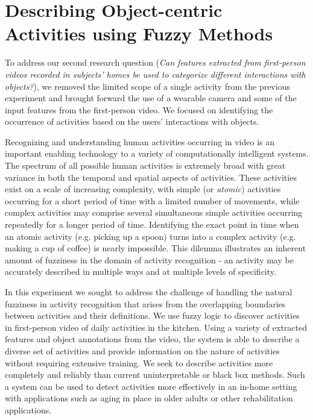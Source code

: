 \documentclass[12pt]{report}
\begin{document}
\section{Describing Object-centric Activities using Fuzzy Methods}
To address our second research question (\emph{Can features extracted from first-person videos recorded in subjects’ homes be used to categorize different interactions with objects?}), we removed the limited scope of a single activity from the previous experiment and brought forward the use of a wearable camera and some of the input features from the first-person video. We focused on identifying the occurrence of activities based on the users' interactions with objects.

Recognizing and understanding human activities occurring in video is an important enabling technology to a variety of computationally intelligent systems. The spectrum of all possible human activities is extremely broad with great variance in both the temporal and spatial aspects of activities. These activities exist on a scale of increasing complexity, with simple (or \textit{atomic}) activities occurring for a short period of time with a limited number of movements, while complex activities may comprise several simultaneous simple activities occurring repeatedly for a longer period of time. Identifying the exact point in time when an atomic activity (e.g. picking up a spoon) turns into a complex activity (e.g. making a cup of coffee) is nearly impossible. This dilemma illustrates an inherent amount of fuzziness in the domain of activity recognition - an activity may be accurately described in multiple ways and at multiple levels of specificity.

In this experiment we sought to address the challenge of handling the natural fuzziness in activity recognition that arises from the overlapping boundaries between activities and their definitions. We use fuzzy logic to discover activities in first-person video of daily activities in the kitchen. Using a variety of extracted features and object annotations from the video, the system is able to describe a diverse set of activities and provide information on the nature of activities without requiring extensive training. We seek to describe activities more completely and reliably than current uninterpretable or black box methods. Such a system can be used to detect activities more effectively in an in-home setting with applications such as aging in place in older adults or other rehabilitation applications.
\end{document}
